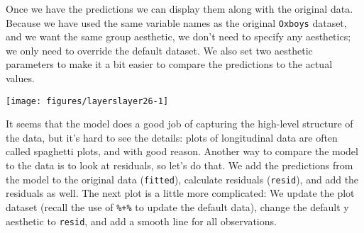 \begin{Shaded}
\begin{Highlighting}[]
\NormalTok{>}\StringTok{ }\StringTok{ }\NormalTok{(-}\NormalTok{, }\NormalTok{, } \NormalTok{)}
\NormalTok{>}\StringTok{ }\StringTok{ }
\NormalTok{>}\StringTok{ }
\ErrorTok{>}\StringTok{ }\StringTok{ }\NormalTok{(}  
\NormalTok{>}\StringTok{ }\StringTok{ }
\end{Highlighting}
\end{Shaded}

Once we have the predictions we can display them along with the original
data. Because we have used the same variable names as the original
\texttt{Oxboys} dataset, and we want the same group aesthetic, we don't
need to specify any aesthetics; we only need to override the default
dataset. We also set two aesthetic parameters to make it a bit easier to
compare the predictions to the actual values.

\begin{Shaded}
\begin{Highlighting}[]
\NormalTok{>}\StringTok{ }\StringTok{ }\NormalTok{(}  \NormalTok{, } \NormalTok{)}
\end{Highlighting}
\end{Shaded}

\texttt{[image: figures/layerslayer26-1]}

It seems that the model does a good job of capturing the high-level
structure of the data, but it's hard to see the details: plots of
longitudinal data are often called spaghetti plots, and with good
reason. Another way to compare the model to the data is to look at
residuals, so let's do that. We add the predictions from the model to
the original data (\texttt{fitted}), calculate residuals
(\texttt{resid}), and add the residuals as well. The next plot is a
little more complicated: We update the plot dataset (recall the use of
\texttt{\%+\%} to update the default data), change the default y
aesthetic to \texttt{resid}, and add a smooth line for all observations.

